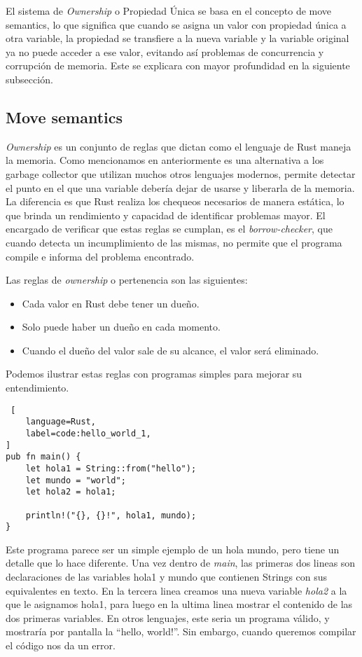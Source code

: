 El sistema de \textit{Ownership} o Propiedad Única se basa en el concepto de move semantics, lo que significa que cuando se asigna un valor con propiedad única a otra variable, la propiedad se transfiere a la nueva variable y la variable original ya no puede acceder a ese valor, evitando así problemas de concurrencia y corrupción de memoria. Este se explicara con mayor profundidad en la siguiente subsección. 

\subsection{Move semantics}

\textit{Ownership} es un conjunto de reglas que dictan como el lenguaje de Rust maneja la memoria. Como mencionamos en anteriormente es una alternativa a los garbage collector que utilizan muchos otros lenguajes modernos, permite detectar el punto en el que una variable debería dejar de usarse y liberarla de la memoria. La diferencia es que Rust realiza los chequeos necesarios de manera estática, lo que brinda un rendimiento y capacidad de identificar problemas mayor. El encargado de verificar que estas reglas se cumplan, es el \textit{borrow-checker}, que cuando detecta un incumplimiento de las mismas, no permite que el programa compile e informa del problema encontrado.

Las reglas de \textit{ownership} o pertenencia son las siguientes:
\begin{itemize}[noitemsep, nolistsep]
    \item Cada valor en Rust debe tener un dueño.
    \item Solo puede haber un dueño en cada momento.
    \item Cuando el dueño del valor sale de su alcance, el valor será eliminado.
\end{itemize}

Podemos ilustrar estas reglas con programas simples para mejorar su entendimiento.
\begin{lstlisting} [
    language=Rust,
    label=code:hello_world_1,
]
pub fn main() {
    let hola1 = String::from("hello");
    let mundo = "world";
    let hola2 = hola1;

    println!("{}, {}!", hola1, mundo);
}
\end{lstlisting}

Este programa parece ser un simple ejemplo de un hola mundo, pero tiene un detalle que lo hace diferente. Una vez dentro de \textit{main}, las primeras dos lineas son declaraciones de las variables hola1 y mundo que contienen Strings con sus equivalentes en texto. En la tercera linea creamos una nueva variable \textit{hola2} a la que le asignamos hola1, para luego en la ultima linea mostrar el contenido de las dos primeras variables. En otros lenguajes, este seria un programa válido, y mostraría por pantalla la ``hello, world!''. Sin embargo, cuando queremos compilar el código nos da un error.

